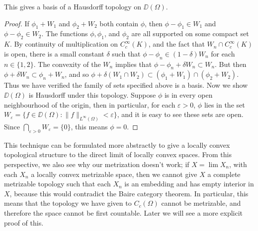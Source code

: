 \begin{theorem}
    This gives a basis of a Hausdorff topology on $\DD(\Omega)$.
\end{theorem}
\begin{proof}
    If $\phi_1 + W_1$ and $\phi_2 + W_2$ both contain $\phi$, then $\phi - \phi_1 \in W_1$ and $\phi - \phi_2 \in W_2$. The functions $\phi, \phi_1$, and $\phi_2$ are all supported on some compact set $K$. By continuity of multiplication on $C_c^\infty(K)$, and the fact that $W_n \cap C_c^\infty(K)$ is open, there is a small constant $\delta$ such that $\phi - \phi_n \in (1 - \delta) W_n$ for each $n \in \{ 1, 2 \}$. The convexity of the $W_n$ implies that $\phi - \phi_n + \delta W_n \subset W_n$. But then $\phi + \delta W_n \subset \phi_n + W_n$, and so $\phi + \delta (W_1 \cap W_2) \subset (\phi_1 + W_1) \cap (\phi_2 + W_2)$. Thus we have verified the family of sets specified above is a basis. Now we show $\DD(\Omega)$ is Hausdorff under this topology. Suppose $\phi$ is in every open neighbourhood of the origin, then in particular, for each $\varepsilon > 0$, $\phi$ lies in the set $W_\varepsilon = \{ f \in \DD(\Omega): \| f \|_{L^\infty(\Omega)} < \varepsilon \}$, and it is easy to see these sets are open. Since $\bigcap_{\varepsilon > 0} W_\varepsilon = \{ 0 \}$, this means $\phi = 0$.
\end{proof}

\begin{remark}
    This technique can be formulated more abstractly to give a locally convex topological structure to the direct limit of locally convex spaces. From this perspective, we also see why our metrization doesn't work; if $X = \lim X_n$, with each $X_n$ a locally convex metrizable space, then we cannot give $X$ a complete metrizable topology such that each $X_n$ is an embedding and has empty interior in $X$, because this would contradict the Baire category theorem. In particular, this means that the topology we have given to $C_c(\Omega)$ cannot be metrizable, and therefore the space cannot be first countable. Later we will see a more explicit proof of this.
\end{remark}

